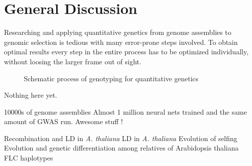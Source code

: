 \chapter{General Discussion} %
\label{Chapter6}

Researching and applying quantitative genetics from genome assemblies to genomic selection
is tedious with many error-prone steps involved. To obtain optimal results every step in
the entire process has to be optimized individually, without loosing the larger frame out
of sight. 


\begin{figure}
  \begin{small}
    \begin{center}
        \caption[Schematic process of genotyping for quantitative genetics]{Schematic process of genotyping for quantitative genetics}
    \end{center}
  \end{small}
\end{figure}

Nothing here yet.

10000s of genome assemblies
Almost 1 million neural nets trained and the same amount of GWAS run.
Awesome stuff ! 



Recombination and LD in \textit{A. thaliana} \cite{kim2007recombination}
LD in \textit{A. thaliana} \cite{nordborg2002extent}
Evolution of selfing \cite{tang2007evolution}
Evolution and genetic differentiation among relatives of Arabidopsis thaliana \cite{koch2007evolution}
FLC haplotypes \cite{li2014multiple}


